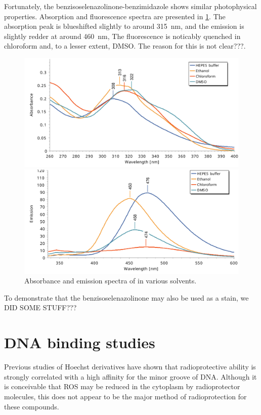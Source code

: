 \begin{refsection}
Fortunately, the benzisoselenazolinone-benzimidazole  shows similar photophysical properties.
Absorption and fluorescence spectra are presented in \cref{fig:ebs-rhs-spectra}.
The absorption peak is blueshifted slightly to around 315~nm, and the emission is slightly redder at around 460~nm,
The fluorescence is noticably quenched in chloroform and, to a lesser extent, DMSO.
The reason for this is not clear???.

\begin{figure} 
    \centering
    \includegraphics[width=0.95\linewidth]{Figures/ebs-rhs-abs.pdf}

    \includegraphics[width=0.95\linewidth]{Figures/ebs-rhs-fl.pdf}
    \caption{Absorbance and emission spectra of  in various solvents.}
    \label{fig:ebs-rhs-spectra}
\end{figure}

To demonstrate that the benzisoselenazolinone  may also be used as a stain, we DID SOME STUFF???



\section{DNA binding studies}
Previous studies of Hoechst derivatives have shown that radioprotective ability is strongly correlated with a high affinity for the minor groove of DNA.
Although it is conceivable that ROS may be reduced in the cytoplasm by radioprotector molecules, this does not appear to be the major method of radioprotection for these compounds.


\end{refsection}
